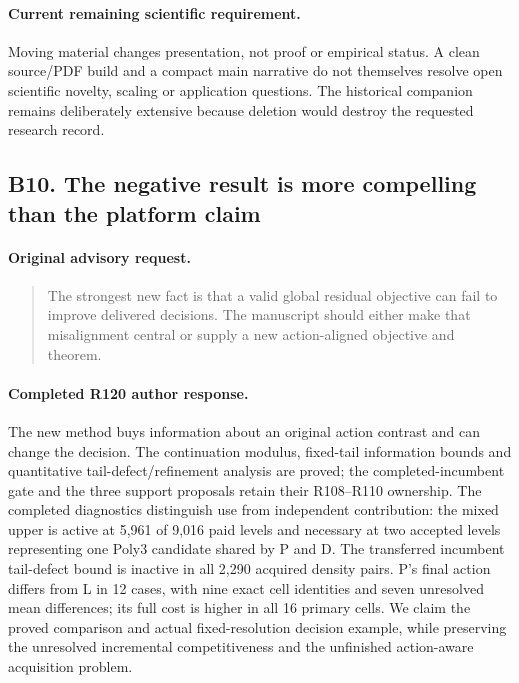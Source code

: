 \paragraph{Current remaining scientific requirement.}
Moving material changes presentation, not proof or empirical status. A clean source/PDF build and a compact main narrative do not themselves resolve open scientific novelty, scaling or application questions. The historical companion remains deliberately extensive because deletion would destroy the requested research record.

\subsection{B10. The negative result is more compelling than the platform claim}
\label{response122:B10}

\paragraph{Original advisory request.}
\begin{quote}
The strongest new fact is that a valid global residual objective can fail to improve delivered decisions. The manuscript should either make that misalignment central or supply a new action-aligned objective and theorem.
\end{quote}

\paragraph{Completed R120 author response.}
The new method buys information about an original action contrast and can change the decision. The continuation modulus, fixed-tail information bounds and quantitative tail-defect/refinement analysis are proved; the completed-incumbent gate and the three support proposals retain their R108--R110 ownership. The completed diagnostics distinguish use from independent contribution: the mixed upper is active at 5,961 of 9,016 paid levels and necessary at two accepted levels representing one Poly3 candidate shared by P and D. The transferred incumbent tail-defect bound is inactive in all 2,290 acquired density pairs. P's final action differs from L in 12 cases, with nine exact cell identities and seven unresolved mean differences; its full cost is higher in all 16 primary cells. We claim the proved comparison and actual fixed-resolution decision example, while preserving the unresolved incremental competitiveness and the unfinished action-aware acquisition problem.

